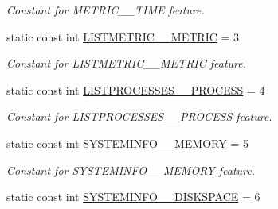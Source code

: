 \begin{DoxyCompactItemize}
\begin{DoxyCompactList}\small\item\em Constant for METRIC\_\-\_\-TIME feature. \item\end{DoxyCompactList}\item 
\hypertarget{classIMS__Data_1_1IMS__DataPackage_a849675756b269ffcad8f249718c6ae9b}{
static const int \hyperlink{classIMS__Data_1_1IMS__DataPackage_a849675756b269ffcad8f249718c6ae9b}{LISTMETRIC\_\-\_\-METRIC} = 3}
\label{classIMS__Data_1_1IMS__DataPackage_a849675756b269ffcad8f249718c6ae9b}

\begin{DoxyCompactList}\small\item\em Constant for LISTMETRIC\_\-\_\-METRIC feature. \item\end{DoxyCompactList}\item 
\hypertarget{classIMS__Data_1_1IMS__DataPackage_adf222b61bc0224d6cbebeb455fe64ab5}{
static const int \hyperlink{classIMS__Data_1_1IMS__DataPackage_adf222b61bc0224d6cbebeb455fe64ab5}{LISTPROCESSES\_\-\_\-PROCESS} = 4}
\label{classIMS__Data_1_1IMS__DataPackage_adf222b61bc0224d6cbebeb455fe64ab5}

\begin{DoxyCompactList}\small\item\em Constant for LISTPROCESSES\_\-\_\-PROCESS feature. \item\end{DoxyCompactList}\item 
\hypertarget{classIMS__Data_1_1IMS__DataPackage_a7b3b86c6b8bfaab2ccdd397362bfca5a}{
static const int \hyperlink{classIMS__Data_1_1IMS__DataPackage_a7b3b86c6b8bfaab2ccdd397362bfca5a}{SYSTEMINFO\_\-\_\-MEMORY} = 5}
\label{classIMS__Data_1_1IMS__DataPackage_a7b3b86c6b8bfaab2ccdd397362bfca5a}

\begin{DoxyCompactList}\small\item\em Constant for SYSTEMINFO\_\-\_\-MEMORY feature. \item\end{DoxyCompactList}\item 
\hypertarget{classIMS__Data_1_1IMS__DataPackage_a6e0053118eb53aaf0b335775a0529669}{
static const int \hyperlink{classIMS__Data_1_1IMS__DataPackage_a6e0053118eb53aaf0b335775a0529669}{SYSTEMINFO\_\-\_\-DISKSPACE} = 6}
\label{classIMS__Data_1_1IMS__DataPackage_a6e0053118eb53aaf0b335775a0529669}


\end{DoxyCompactItemize}
